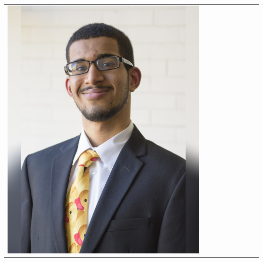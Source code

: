\documentclass[landscape,a0paper,fontscale=0.292]{baposter}
\begin{document}
\begin{poster}
{\begin{center}
\begin{tabularx}{\linewidth}{X X X X X X X X X}
{\centering \includegraphics[width=0.65\linewidth]{garcia-mallen.jpg}}\\ 


\end{tabularx}
\end{center}}
\end{poster}
\end{document}
